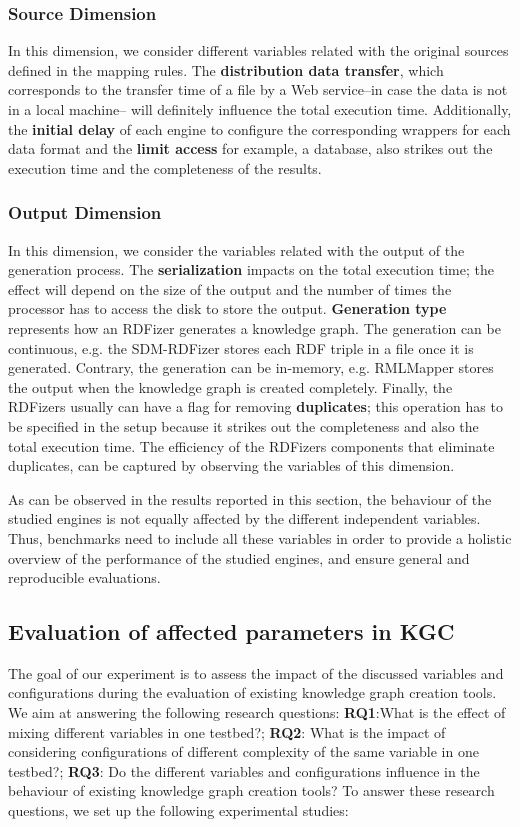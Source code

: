 \subsubsection{Source Dimension}
In this dimension, we consider different variables related with the original sources defined in the mapping rules. The \textbf{distribution data transfer}, which corresponds to the transfer time of a file by a Web service--in case the data is not in a local machine-- will definitely influence the total execution time. Additionally, the \textbf{initial delay} of each engine to configure the corresponding wrappers for each data format and the \textbf{limit access} for example, a database, also strikes out the execution time and the completeness of the results.

\subsubsection{Output Dimension}
In this dimension, we consider the variables related with the output of the generation process. The \textbf{serialization} impacts on the total execution time; the effect will depend on the size of the output and the number of times the processor has to access the disk to store the output. \textbf{Generation type} represents how an RDFizer generates a knowledge graph. The generation can be continuous, e.g. the SDM-RDFizer stores each RDF triple in a file once it is generated. Contrary, the generation can be in-memory, e.g. RMLMapper stores the output when the knowledge graph is created completely. Finally, the RDFizers usually can have a flag for removing \textbf{duplicates}; this operation has to be specified in the setup because it strikes out the completeness and also the total execution time. The efficiency of the RDFizers components that eliminate duplicates, can be captured by observing the variables of this dimension.   

As can be observed in the results reported in this section, the behaviour of the studied engines is not equally affected by the different independent variables. Thus, benchmarks need to include all these variables in order to provide a holistic overview of the performance of the studied engines, and ensure general and reproducible evaluations. 


\subsection{Evaluation of affected parameters in KGC}
The goal of our experiment is to assess the impact of the discussed variables and configurations during the evaluation of existing knowledge graph creation tools. We aim at answering the following research questions: 
\textbf{RQ1}:What is the effect of mixing different variables in one testbed?; \textbf{RQ2}: What is the impact of considering configurations of different complexity of the same variable in one testbed?; \textbf{RQ3}: Do the different variables and configurations influence in the behaviour of existing knowledge graph creation tools?
To answer these research questions, we set up the following experimental studies:

